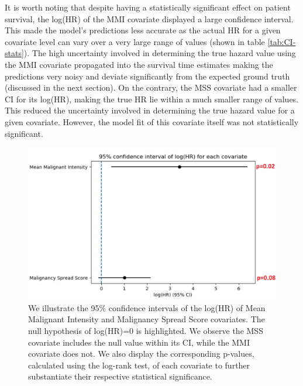 \documentclass{l4proj}
\begin{document}
It is worth noting that despite having a statistically significant effect on patient survival, the log(HR) of the MMI covariate displayed a large confidence interval. This made the model's predictions less accurate as the actual HR for a given covariate level can vary over a very large range of values (shown in table \ref{tab:CI-stats}). The high uncertainty involved in determining the true hazard value using the MMI covariate propagated into the survival time estimates making the predictions very noisy and deviate significantly from the expected ground truth (discussed in the next section). On the contrary, the MSS covariate had a smaller CI for its log(HR), making the true HR lie within a much smaller range of values. This reduced the uncertainty involved in determining the true hazard value for a given covariate. However, the model fit of this covariate itself was not statistically significant.

\begin{figure}[h]
    \centering
    \includegraphics[scale=0.4]{images/95-CI-Interval.png}
    \caption{We illustrate the 95\% confidence intervals of the log(HR) of Mean Malignant Intensity and Malignancy Spread Score covariates. The null hypothesis of log(HR)=0 is highlighted. We observe the MSS covariate includes the null value within its CI, while the MMI covariate does not. We also display the corresponding p-values, calculated using the log-rank test, of each covariate to further substantiate their respective statistical significance.}
    \label{fig:95-CI-interval}
\end{figure}
\end{document}
